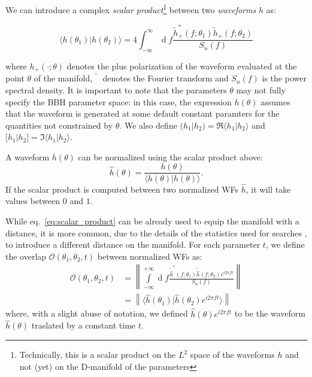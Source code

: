 \documentclass[twocolumn,showpacs,preprintnumbers,nofootinbib,prd,
superscriptaddress,10pt]{revtex4-1}
\renewcommand{\d}[1]{\ensuremath{\operatorname{d}\!{#1}}}
\newcommand{\scalar}[2]{\langle #1|#2 \rangle}
\newcommand{\rescalar}[2]{( #1|#2 )}
\newcommand{\imscalar}[2]{[ #1|#2 ]}
\begin{document}
We can introduce a complex \textit{scalar product}\footnote{
Technically, this is a scalar product on the $L^2$ space of the waveforms $h$ and not (yet) on the D-manifold of the parameters
} between two \textit{waveforms} $h$ as:

\begin{equation} \label{eq:scalar_product}
	\scalar{h(\theta_1)}{h(\theta_2)} = 4 \int_{-\infty}^{\infty} \d{f} \frac{\tilde{h}_+^*(f;\theta_1) \tilde{h}_+(f;\theta_2)}{S_n(f)}
\end{equation}

where $h_+(\cdot; \theta)$ denotes the plus polarization of the waveform evaluated at the point $\theta$ of the manifold, $\tilde{\phantom{h}}$ denotes the Fourier transform and $S_n(f)$ is the power spectral density.
It is important to note that the parameters $\theta$ may not fully specify the BBH parameter space: in this case, the expression $h(\theta)$ assumes that the waveform is generated at some default constant paramters for the quantities not constrained by $\theta$.
We also define $\rescalar{h_1}{h_2} = \Re\scalar{h_1}{h_2}$ and $\imscalar{h_1}{h_2} = \Im\scalar{h_1}{h_2}$.

A waveform $h(\theta)$ can be normalized using the scalar product above:
\begin{equation} \label{eq:normalization}
	\hat{h}(\theta) = \frac{h(\theta)}{\scalar{h(\theta)}{h(\theta)}}.
\end{equation}
If the scalar product is computed between two normalized WFs $\hat{h}$, it will take values between $0$ and $1$.

While eq.~\eqref{eq:scalar_product} can be already used to equip the manifold with a distance, it is more common, due to the details of the statistics used for searches \cite{something}, to introduce a different distance on the manifold.
For each parameter $t$, we define the overlap $\mathcal{O}(\theta_1,\theta_2, t)$ between normalized WFs as:
\begin{align}\label{eq:overlap}
	\mathcal{O}(\theta_1,\theta_2, t) &= \left\| \int\limits_{-\infty}^{+\infty} \d{f} \frac{\tilde{\hat{h}}^*(f;\theta_1)\tilde{\hat{h}}(f;\theta_2) e^{i2\pi ft}}{S_n(f)} \right\| \nonumber\\
	&= \left\| \scalar{\hat{h}(\theta_1)}{\hat{h}(\theta_2)e^{i 2\pi ft}} \right\| 
\end{align}
where, with a slight abuse of notation, we defined $\hat{h}(\theta)e^{i 2\pi ft}$ to be the waveform $\hat{h}(\theta)$ traslated by a constant time $t$.
\end{document}
